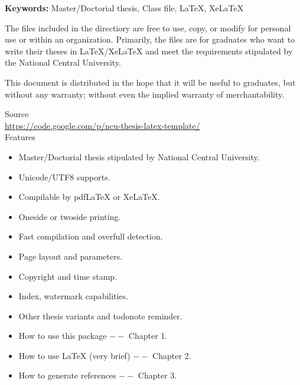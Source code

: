 \begin{abstracten}

{\bf \sf Keywords:} Master/Doctorial thesis, Class file, \LaTeX{}, Xe\LaTeX{}

\vspace{2em}

The files included in the directiory are free to use, copy, or modify for personal use or within an organization. Primarily, the files are for graduates who want to write their theses in \LaTeX{}/Xe\LaTeX{} and meet the requirements stipulated by the National Central University.

This document is distributed in the hope that it will be useful to graduates, but without any warranty; without even the implied warranty of merchantability.
\begin{center}
Source\\
\url{https://code.google.com/p/ncu-thesis-latex-template/}\\
Features
\begin{itemize}
\item Master/Doctorial thesis stipulated by National Central University. 
\item Unicode/UTF8 supports.
\item Compilable by pdf\LaTeX{ } or Xe\LaTeX{}. 
\item Oneside or twoside printing.
\item Fast compilation and overfull detection. 
\item Page layout and parameters.
\item Copyright and time stamp.
\item Index, watermark capabilities.
\item Other thesis variants and todonote reminder.
\item How to use this package $--$ Chapter 1.
\item How to use \LaTeX{} (very brief) $--$ Chapter 2.
\item How to generate references $--$ Chapter 3.
\end{itemize}
\end{center}
\end{abstracten} 

